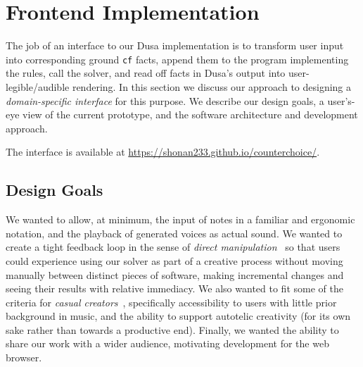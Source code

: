

\section{Frontend Implementation}
\label{sec:ui-implementation}

The job of an interface to our Dusa implementation is to transform user
input into corresponding ground \verb|cf| facts, append them to the program
implementing the rules, call the solver, and read off facts in Dusa's
output into user-legible/audible rendering. In this section we discuss our
approach to designing a {\em domain-specific interface} for this purpose.
We describe our design goals, a user's-eye view of the current prototype,
and the software architecture and development approach.

The interface is available at \url{https://shonan233.github.io/counterchoice/}.

\subsection{Design Goals}

We wanted to allow, at minimum, the input of notes in a familiar and
ergonomic notation, and the playback of generated voices as actual sound.
We wanted to create a tight feedback loop in the
sense of \emph{direct manipulation}~\cite{shneiderman-direct-manip}
so that users could experience using our solver as
part of a creative process without moving manually
between distinct pieces of software, making
incremental changes and seeing their results with
relative immediacy.
We also wanted to fit some of the criteria for
    {\em casual creators}~\cite{compton-casual},
specifically accessibility to users with little
prior background in music, and the ability
to support autotelic creativity (for its own
sake rather than towards a productive end).
Finally, we wanted the ability to share our work
with a wider audience, motivating development for
the web browser.

